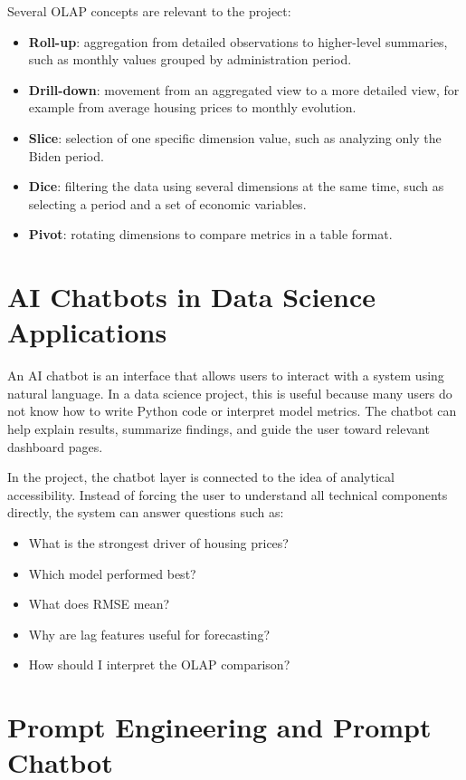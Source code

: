 Several OLAP concepts are relevant to the project:
\begin{itemize}
\item \textbf{Roll-up}: aggregation from detailed observations to higher-level summaries, such as monthly values grouped by administration period.
\item \textbf{Drill-down}: movement from an aggregated view to a more detailed view, for example from average housing prices to monthly evolution.
\item \textbf{Slice}: selection of one specific dimension value, such as analyzing only the Biden period.
\item \textbf{Dice}: filtering the data using several dimensions at the same time, such as selecting a period and a set of economic variables.
\item \textbf{Pivot}: rotating dimensions to compare metrics in a table format.
\end{itemize}

\section{AI Chatbots in Data Science Applications}

An AI chatbot is an interface that allows users to interact with a system using natural language. In a data science project, this is useful because many users do not know how to write Python code or interpret model metrics. The chatbot can help explain results, summarize findings, and guide the user toward relevant dashboard pages.

In the project, the chatbot layer is connected to the idea of analytical accessibility. Instead of forcing the user to understand all technical components directly, the system can answer questions such as:
\begin{itemize}
\item What is the strongest driver of housing prices?
\item Which model performed best?
\item What does RMSE mean?
\item Why are lag features useful for forecasting?
\item How should I interpret the OLAP comparison?
\end{itemize}

\section{Prompt Engineering and Prompt Chatbot}


